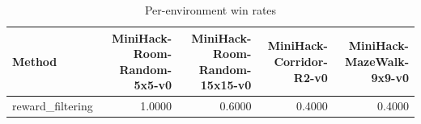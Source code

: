 \begin{table}[htbp]
\centering
\caption{Per-environment win rates}
\label{tab:per-env}
\begin{tabular}{lrrrr}
\toprule
\textbf{Method} & \textbf{MiniHack-Room-Random-5x5-v0} & \textbf{MiniHack-Room-Random-15x15-v0} & \textbf{MiniHack-Corridor-R2-v0} & \textbf{MiniHack-MazeWalk-9x9-v0} \\
\midrule
reward\_filtering & 1.0000 & 0.6000 & 0.4000 & 0.4000 \\
\bottomrule
\end{tabular}
\end{table}